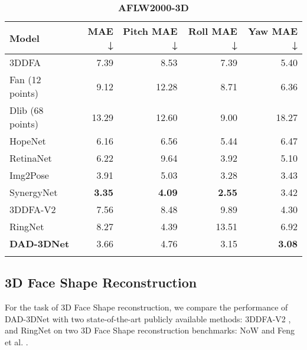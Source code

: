 \documentclass[10pt,twocolumn,letterpaper]{article}
\begin{document}
\begin{table}[t]
\begin{subtable}[t]{.99\linewidth}
{\begin{adjustbox}{width=0.99\textwidth}
\begin{tabular}{@{}lrrrr@{}}
\noalign{\smallskip}
\toprule \textbf{Model} & \textbf{MAE} ↓ & \textbf{Pitch MAE} ↓ & \textbf{Roll MAE} ↓ & \textbf{Yaw MAE} ↓ \\\toprule 3DDFA\cite{3ddfa_cleardusk, zhu2017face} & 7.39 & 8.53 & 7.39 & 5.40\\
Fan (12 points)\cite{FacePoseNet} & 9.12 & 12.28 & 8.71 & 6.36\\
Dlib (68 points)\cite{dlib09} & 13.29 & 12.60 & 9.00 & 18.27\\
HopeNet\cite{HOPE-Net} & 6.16 & 6.56 & 5.44 & 6.47\\
RetinaNet\cite{RetinaFace} & 6.22 & 9.64 & 3.92 & 5.10\\
Img2Pose\cite{img2pose} & 3.91 & 5.03 & 3.28 & 3.43\\
SynergyNet\cite{wu2021synergy} & \textbf{3.35} & \textbf{4.09} & \textbf{2.55} & 3.42\\
3DDFA-V2\cite{3ddfa_cleardusk, guo2020towards} & 7.56 & 8.48 & 9.89 & 4.30\\
RingNet\cite{RingNet} & 8.27 & 4.39 & 13.51 & 6.92\\
\textbf{DAD-3DNet} & 3.66 & 4.76 & 3.15 & \textbf{3.08}\\\bottomrule \noalign{\smallskip}
\end{tabular}
\end{adjustbox}
\caption{\textbf{AFLW2000-3D}\cite{AFLW2000-3D}}
\label{t:3dpose_aflw} }	
	\end{subtable}
\vspace{-2.0em}
\label{t:3dpose}
\end{table}
\hspace{2em} 

\subsection{3D Face Shape Reconstruction}\label{ssec:3d_head_shape_reconstruction}
For the task of 3D Face Shape reconstruction, we compare the performance of DAD-3DNet with two state-of-the-art publicly available methods: 3DDFA-V2 \cite{3ddfa_cleardusk, guo2020towards},  and RingNet \cite{RingNet} on two 3D Face Shape reconstruction benchmarks: NoW \cite{RingNet} and Feng et al. \cite{3d-face-modeling-from-diverse-raw-scan-data}.
\end{document}
